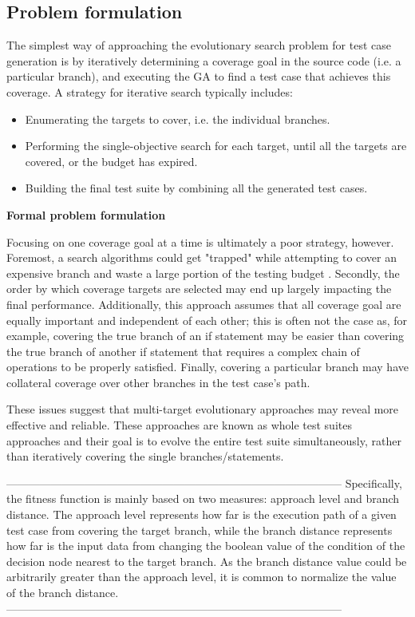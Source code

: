 \subsection*{Problem formulation}
The simplest way of approaching the evolutionary search problem for test case generation is by iteratively determining a coverage goal in the source code (i.e. a particular branch), and executing the GA to find a test case that achieves this coverage. 
A strategy for iterative search typically includes:
\begin{itemize}
    \item Enumerating the targets to cover, i.e. the individual branches.
    \item Performing the single-objective search for each target, until all the targets are covered, or the budget has expired.
    \item Building the final test suite by combining all the generated test cases.
\end{itemize}

\textbf{Formal problem formulation}

Focusing on one coverage goal at a time is ultimately a poor strategy, however. Foremost, a search algorithms could get "trapped" while attempting to cover an expensive branch and waste a large portion of the testing budget \cite{DBLP:journals/tse/FraserA13}.
Secondly, the order by which coverage targets are selected may end up largely impacting the final performance.
Additionally, this approach assumes that all coverage goal are equally important and independent of each other; this is often not the case as, for example, covering the true branch of an if statement may be easier than covering the true branch of another if statement that requires a complex chain of operations to be properly satisfied. Finally, covering a particular branch may have collateral coverage over other branches in the test case's path.

These issues suggest that multi-target evolutionary approaches may reveal more effective and reliable. These approaches are known as whole test suites approaches and their goal is to evolve the entire test suite simultaneously, rather than iteratively covering the single branches/statements.
\cite{QSIC11}

------------------------------------------------------------------------------------------
Specifically, the fitness function is mainly based on two measures:
approach level and branch distance. The approach level represents how
far is the execution path of a given test case from covering the target branch,
while the branch distance represents how far is the input data from changing the
boolean value of the condition of the decision node nearest to the target branch.
As the branch distance value could be arbitrarily greater than the approach
level, it is common to normalize the value of the branch distance.
------------------------------------------------------------------------------------------

